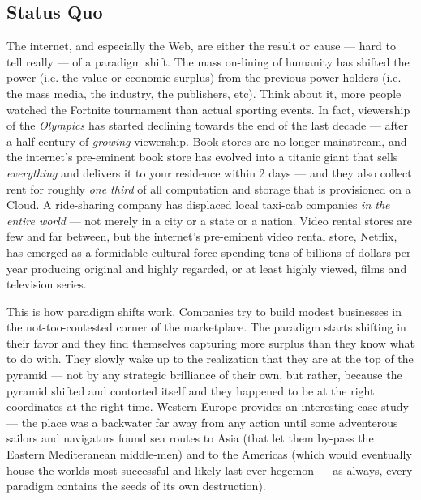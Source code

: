 \documentclass[a4paper]{article}
\begin{document}
\subsection{Status Quo}
The internet, and especially the Web, are either the result or cause ---
hard to tell really --- of a paradigm shift. The mass on-lining of
humanity has shifted the power (i.e. the value or economic surplus) from
the previous power-holders (i.e. the mass media, the industry, the
publishers, etc). Think about it, more people watched the Fortnite
tournament than actual sporting events. In fact, viewership of the
\emph{Olympics} has started declining towards the end of the last
decade --- after a half century of \emph{growing} viewership. Book
stores are no longer mainstream, and the internet's pre-eminent book
store has evolved into a titanic giant that sells \emph{everything}
and delivers it to your residence within 2 days --- and they also
collect rent for roughly \emph{one third} of all computation and
storage that is provisioned on a Cloud. A ride-sharing company has
displaced local taxi-cab companies \emph{in the entire world} --- not
merely in a city or a state or a nation. Video rental stores are few and
far between, but the internet's pre-eminent video rental store, Netflix,
has emerged as a formidable cultural force spending tens of billions of
dollars per year producing original and highly regarded, or at least
highly viewed, films and television series.

This is how paradigm shifts work. Companies try to build modest
businesses in the not-too-contested corner of the marketplace. The
paradigm starts shifting in their favor and they find themselves
capturing more surplus than they know what to do with. They slowly wake
up to the realization that they are at the top of the pyramid --- not by
any strategic brilliance of their own, but rather, because the pyramid
shifted and contorted itself and they happened to be at the right
coordinates at the right time. Western Europe provides an interesting
case study --- the place was a backwater far away from any action until
some adventerous sailors and navigators found sea routes to Asia (that
let them by-pass the Eastern Mediteranean middle-men) and to the
Americas (which would eventually house the worlds most successful and
likely last ever hegemon --- as always, every paradigm contains the
seeds of its own destruction).
\end{document}
